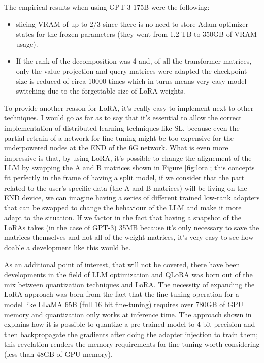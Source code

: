 The empirical results when using GPT-3 175B were the following:
\begin{itemize}
	\item slicing VRAM of up to $2/3$ since there is no need to store Adam optimizer states for
	      the frozen parameters (they went from 1.2 TB to 350GB of VRAM usage).
	\item If the rank of the decomposition was 4 and, of all the transformer matrices, only the
	      value projection and query matrices were adapted the checkpoint size is reduced of
	      circa 10000 times which in turns means very easy model switching due to the
	      forgettable size of LoRA weights.
\end{itemize}
To provide another reason for LoRA, it's really easy to implement next to other techniques. I would
go as far as to say that it's essential to allow the correct implementation of distributed
learning techniques like SL, because even the partial retrain of a network for fine-tuning might be
too expensive for the underpowered nodes at the END of the 6G network. What is even more impressive
is that, by using LoRA, it's possible to change the alignement of the LLM by swapping the A and
B matrices shown in Figure \ref{fig:lora}; this concepts fit perfectly in the frame of having a
split model, if we consider that the part related to the user's specific data (the A and B matrices)
will be living on the END device, we can imagine having a series of different trained low-rank
adapters that can be swapped to change the behaviour of the LLM and make it more adapt to the
situation. If we factor in the fact that having a snapshot of the LoRAs takes (in the case of GPT-3)
35MB because it's only necessary to save the matrices themselves and not all of the weight matrices,
it's very easy to see how doable a development like this would be.

As an additional point of interest, that will not be covered, there have been developments in the
field of LLM optimization and QLoRA was born out of the mix between quantization techniques and
LoRA. The necessity of expanding the LoRA approach was born from the fact that the fine-tuning
operation for a model like LLaMA 65B (full 16 bit fine-tuning) requires over 780GB of GPU memory
and quantization only works at inference time. The approach shown in \cite{qlora} explains how it is
possible to quantize a pre-trained model to 4 bit precision and then backpropagate the gradients
after doing the adapter injection to train them; this revelation renders the memory requirements for
fine-tuning worth considering (less than 48GB of GPU memory).
